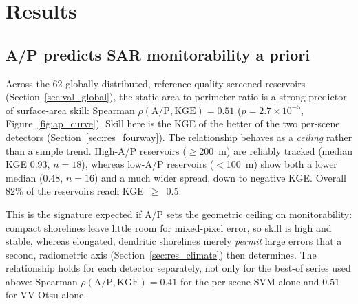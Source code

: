 \section{Results}
\label{sec:results}


\subsection{A/P predicts SAR monitorability a priori}
\label{sec:res_ap}

Across the 62 globally distributed, reference-quality-screened reservoirs
(Section~\ref{sec:val_global}), the static area-to-perimeter ratio is a strong
predictor of surface-area skill: Spearman $\rho(\text{A/P},\text{KGE}) = 0.51$
($p = 2.7\times10^{-5}$, Figure~\ref{fig:ap_curve}). Skill here is the KGE of the
better of the two per-scene detectors (Section~\ref{sec:res_fourway}). The
relationship behaves as a \emph{ceiling} rather than a simple trend. High-A/P
reservoirs ($\geq$200~m) are reliably tracked (median KGE 0.93, $n=18$),
whereas low-A/P reservoirs ($<$100~m) show both a lower median (0.48, $n=16$)
and a much wider spread, down to negative KGE. Overall 82\% of the reservoirs
reach KGE~$\geq$~0.5.

This is the signature expected if A/P sets the geometric ceiling on
monitorability: compact shorelines leave little room for mixed-pixel error, so
skill is high and stable, whereas elongated, dendritic shorelines merely
\emph{permit} large errors that a second, radiometric axis
(Section~\ref{sec:res_climate}) then determines. The relationship holds for
each detector separately, not only for the best-of series used above:
Spearman $\rho(\text{A/P},\text{KGE}) = 0.41$ for the per-scene SVM alone and
$0.51$ for VV Otsu alone.

